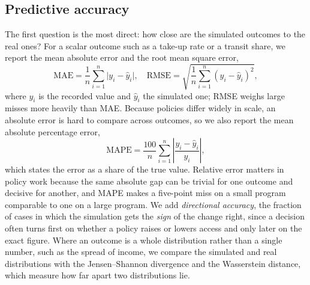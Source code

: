 \documentclass[conference]{IEEEtran}
\begin{document}
\subsection{Predictive accuracy}
The first question is the most direct: how close are the simulated outcomes to the real ones? For a scalar outcome such as a take-up rate or a transit share, we report the mean absolute error and the root mean square error,
\begin{equation}
\mathrm{MAE} = \frac{1}{n}\sum_{i=1}^{n}\lvert y_i - \hat{y}_i\rvert, \quad
\mathrm{RMSE} = \sqrt{\frac{1}{n}\sum_{i=1}^{n}(y_i - \hat{y}_i)^2},
\end{equation}
where $y_i$ is the recorded value and $\hat{y}_i$ the simulated one; RMSE weighs large misses more heavily than MAE. Because policies differ widely in scale, an absolute error is hard to compare across outcomes, so we also report the mean absolute percentage error,
\begin{equation}
\mathrm{MAPE} = \frac{100}{n}\sum_{i=1}^{n}\left\lvert \frac{y_i - \hat{y}_i}{y_i}\right\rvert,
\end{equation}
which states the error as a share of the true value. Relative error matters in policy work because the same absolute gap can be trivial for one outcome and decisive for another, and MAPE makes a five-point miss on a small program comparable to one on a large program. We add \emph{directional accuracy}, the fraction of cases in which the simulation gets the \emph{sign} of the change right, since a decision often turns first on whether a policy raises or lowers access and only later on the exact figure. Where an outcome is a whole distribution rather than a single number, such as the spread of income, we compare the simulated and real distributions with the Jensen--Shannon divergence and the Wasserstein distance, which measure how far apart two distributions lie.
\end{document}
